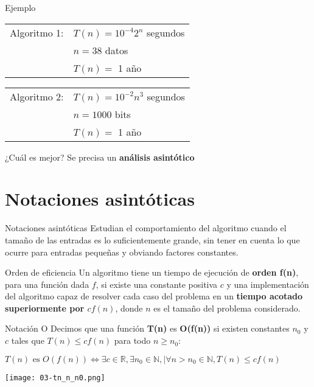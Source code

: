 \begin{frame}[c]{Ejemplo}

  \begin{table}[]
  \begin{tabular}{ll}
    Algoritmo 1:  & $T(n) = 10^{-4} 2^{n}$ segundos\\
    & $n = 38$ datos\\
    & $T(n) = $ 1 año\\
  \end{tabular}
  \end{table}
  \begin{table}[]
  \begin{tabular}{ll}
    Algoritmo 2:  & $T(n) = 10^{-2} n^{3}$ segundos\\
    & $n = 1000$ bits\\
    & $T(n) = $ 1 año\\
  \end{tabular}
  \end{table}

  \vspace{\baselineskip}
  ¿Cuál es mejor? Se precisa un \textbf{análisis asintótico}
\end{frame}

\section{Notaciones asintóticas}

\begin{frame}[c]{Notaciones asintóticas}
  Estudian el comportamiento del algoritmo cuando el
  tamaño de las entradas es lo suficientemente grande,
  sin tener en cuenta lo que ocurre para entradas
  pequeñas y obviando factores constantes.
\end{frame}

\begin{frame}[c]{Orden de eficiencia}
  Un algoritmo tiene un tiempo de ejecución de \textbf{orden
  f(n)}, para una función dada $f$, si existe una constante
  positiva $c$ y una implementación del algoritmo capaz
  de resolver cada caso del problema en un \textbf{tiempo 
  acotado superiormente por $c f(n)$}, donde $n$ es el
  tamaño del problema considerado.
\end{frame}

\begin{frame}[c]{Notación O}
  Decimos que una función \textbf{T(n)} es \textbf{O(f(n))}
  si existen constantes $n_0$ y $c$ tales que $T(n) \leq cf(n)$
  para todo $n \geq n_0$:

  \vspace{\baselineskip}
  \begin{math}
    T(n) \textrm{ es } O(f(n)) \iff \exists c \in \mathbb{R}, \exists n_0 \in \mathbb{N},
    | \forall n > n_0 \in \mathbb{N}, T(n) \leq cf(n)
  \end{math}

  \vspace{\baselineskip}
  \begin{center}
    \texttt{[image: 03-tn\_n\_n0.png]}
  \end{center}
\end{frame}

